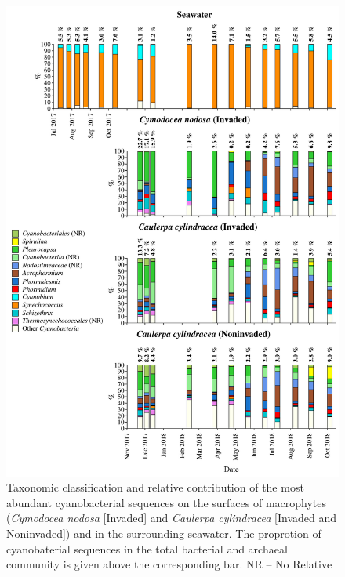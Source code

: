 \documentclass[12pt,]{article}
\begin{document}
\begin{figure}[H]

{\centering \includegraphics[width=0.85\linewidth]{../results/figures/cyanobacteria_bar_plot} 

}

\caption{Taxonomic classification and relative contribution of the most abundant cyanobacterial sequences on the surfaces of macrophytes (\textit{Cymodocea nodosa} [Invaded] and \textit{Caulerpa cylindracea} [Invaded and Noninvaded]) and in the surrounding seawater. The proprotion of cyanobaterial sequences in the total bacterial and archaeal community is given above the corresponding bar. NR -- No Relative\label{cyano}}\label{fig:unnamed-chunk-7}
\end{figure}
\end{document}
